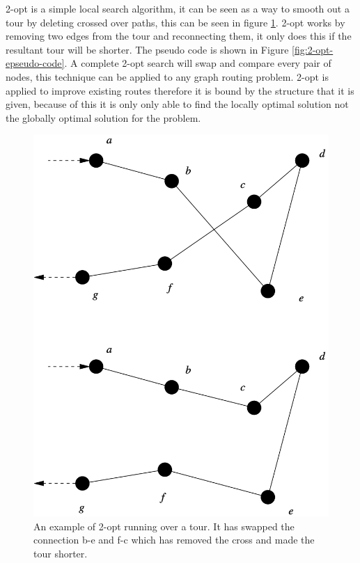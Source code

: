 2-opt is a simple local search algorithm, it can be seen as a way to smooth out a tour by deleting crossed over paths, this can be seen in figure \ref{fig:2-opt-example}. 2-opt works by removing two edges from the tour and reconnecting them, it only does this if the resultant tour will be shorter. The pseudo code is shown in Figure \ref{fig:2-opt-epseudo-code}. A complete 2-opt search will swap and compare every pair of nodes, this technique can be applied to any graph routing problem. 2-opt is applied to improve existing routes therefore it is bound by the structure that it is given, because of this it is only only able to find the locally optimal solution not the globally optimal solution for the problem. 

\begin{figure}
    \centering
    \includegraphics[width=\textwidth]{figures/2-opt-example.png}
    \caption{An example of 2-opt running over a tour. It has swapped the connection b-e and f-c which has removed the cross and made the tour shorter.\cite{2_opt_example_picture}}
    \label{fig:2-opt-example}
\end{figure}

